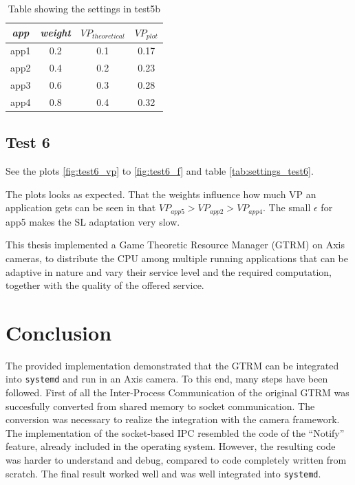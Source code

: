 \documentclass[nobiblatex]{LTHthesis}
\begin{document}
 



\begin{table}[h]
  \centering
  \begin{tabular}{|c|c|c|c|}
 	\hline 
   \emph{app} & \emph{weight} & $VP_{theoretical}$ & $VP_{plot}$  \\ \hline
	app1 & 0.2 & 0.1 & 	0.17	\\ \hline
	app2 & 0.4 & 0.2 & 	0.23 \\ \hline
	app3 & 0.6 & 0.3 & 	0.28 \\ \hline
	app4 & 0.8 & 0.4 &  0.32 \\ \hline
  \end{tabular}
  \caption{Table showing the settings in test5b}
  \label{tab:VP_test5b}
\end{table}

\subsection{Test 6}
See the plots \ref{fig:test6_vp} to \ref{fig:test6_f} and table \ref{tab:settings_test6}.

The plots looks as expected.
That the weights influence how much VP an application gets can be seen in that $VP_{app5}>VP_{app2}>VP_{app4}$. 
The small $\epsilon$ for app5 makes the SL adaptation very slow.






This thesis implemented a Game Theoretic Resource Manager (GTRM) on Axis
cameras, to distribute the CPU among multiple running applications that can
be adaptive in nature and vary their service level and the required
computation, together with the quality of the offered service.

\section{Conclusion}

The provided implementation demonstrated that the GTRM can be integrated into
\texttt{systemd} and run in an Axis camera. To this end, many steps have been
followed. First of all the Inter-Process Communication of the original GTRM
was succesfully converted from shared memory to socket communication. The
conversion was necessary to realize the integration with the camera
framework. The implementation of the socket-based IPC resembled the
code of the ``Notify'' feature, already included in the operating system.
However, the resulting code was harder to understand and debug, compared to
code completely written from scratch. The final result worked well and was
well integrated into \texttt{systemd}.
\end{document}
